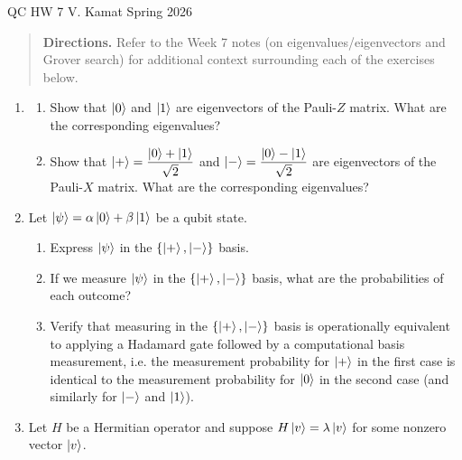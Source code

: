 \documentclass[12pt]{article}
\begin{document}
	
\centerline{QC HW 7
	\hspace{0.4 in}V. Kamat
	\hspace{0.4 in}Spring 2026}
	\begin{quote}
		{\sf
		{\bf Directions.} Refer to the Week 7 notes (on eigenvalues/eigenvectors and Grover search) for additional context surrounding each of the exercises below.  
		}
	\end{quote}
\begin{enumerate}
\item \begin{enumerate}
\item[(a)] Show that $\ket{0}$ and $\ket{1}$ are eigenvectors of the Pauli-$Z$ matrix. What are the corresponding eigenvalues?

\item[(b)] Show that $\ket{+}=\dfrac{\ket{0}+\ket{1}}{\sqrt2}$ and $\ket{-}=\dfrac{\ket{0}-\ket{1}}{\sqrt2}$ are eigenvectors of the Pauli-$X$ matrix. What are the corresponding eigenvalues?
\end{enumerate}
\item Let $\ket{\psi}=\alpha\ket{0}+\beta\ket{1}$ be a qubit state.

\begin{enumerate}
\item[(a)] Express $\ket{\psi}$ in the $\{\ket{+},\ket{-}\}$ basis.

\item[(b)] If we measure $\ket{\psi}$ in the $\{\ket{+},\ket{-}\}$ basis, what are the probabilities of each outcome?

\item[(c)] Verify that measuring in the $\{\ket{+},\ket{-}\}$ basis is operationally equivalent to applying a Hadamard gate followed by a computational basis measurement, i.e. the measurement probability for $\ket{+}$ in the first case is identical to the measurement probability for $\ket{0}$ in the second case (and similarly for $\ket{-}$ and $\ket{1}$).

\end{enumerate}
\item Let $H$ be a Hermitian operator and suppose $H\ket{v}=\lambda\ket{v}$ for some nonzero vector $\ket{v}$.


\end{enumerate}
\end{document}
